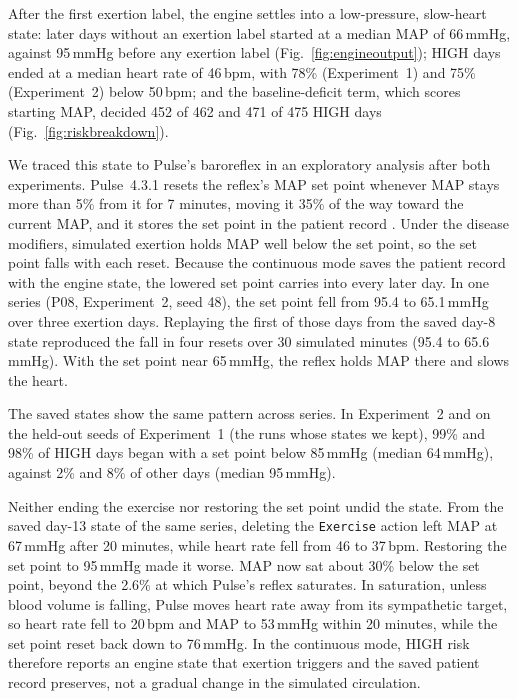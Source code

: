 \documentclass[conference]{IEEEtran}
\newcommand{\code}[1]{\texttt{\footnotesize #1}}
\begin{document}
After the first exertion label, the engine settles into a low-pressure, slow-heart state: later days without an exertion label started at a median MAP of 66\,mmHg, against 95\,mmHg before any exertion label (Fig.~\ref{fig:engineoutput}); HIGH days ended at a median heart rate of 46\,bpm, with 78\% (Experiment~1) and 75\% (Experiment~2) below 50\,bpm; and the baseline-deficit term, which scores starting MAP, decided 452 of 462 and 471 of 475 HIGH days (Fig.~\ref{fig:riskbreakdown}).

We traced this state to Pulse's baroreflex in an exploratory analysis after both experiments. Pulse~4.3.1 resets the reflex's MAP set point whenever MAP stays more than 5\% from it for 7 minutes, moving it 35\% of the way toward the current MAP, and it stores the set point in the patient record \cite{pulse_nervous431}. Under the disease modifiers, simulated exertion holds MAP well below the set point, so the set point falls with each reset. Because the continuous mode saves the patient record with the engine state, the lowered set point carries into every later day. In one series (P08, Experiment~2, seed 48), the set point fell from 95.4 to 65.1\,mmHg over three exertion days. Replaying the first of those days from the saved day-8 state reproduced the fall in four resets over 30 simulated minutes (95.4 to 65.6\,mmHg). With the set point near 65\,mmHg, the reflex holds MAP there and slows the heart.

The saved states show the same pattern across series. In Experiment~2 and on the held-out seeds of Experiment~1 (the runs whose states we kept), 99\% and 98\% of HIGH days began with a set point below 85\,mmHg (median 64\,mmHg), against 2\% and 8\% of other days (median 95\,mmHg).

Neither ending the exercise nor restoring the set point undid the state. From the saved day-13 state of the same series, deleting the \code{Exercise} action left MAP at 67\,mmHg after 20 minutes, while heart rate fell from 46 to 37\,bpm. Restoring the set point to 95\,mmHg made it worse. MAP now sat about 30\% below the set point, beyond the 2.6\% at which Pulse's reflex saturates. In saturation, unless blood volume is falling, Pulse moves heart rate away from its sympathetic target, so heart rate fell to 20\,bpm and MAP to 53\,mmHg within 20 minutes, while the set point reset back down to 76\,mmHg. In the continuous mode, HIGH risk therefore reports an engine state that exertion triggers and the saved patient record preserves, not a gradual change in the simulated circulation.
\end{document}
